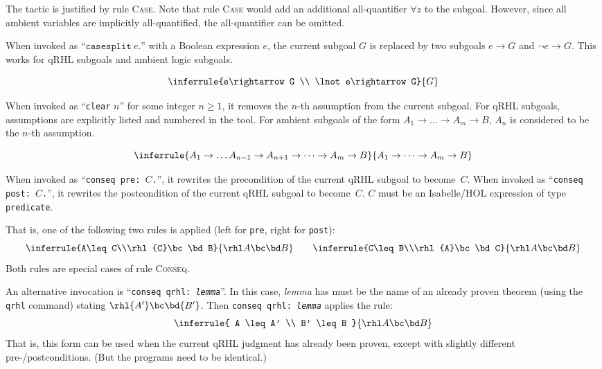 \documentclass{article}
\renewcommand\ruleref[1]{rule \hbox{\textsc{#1}}}
\begin{document}
The tactic is justified by \ruleref{Case}. Note that \ruleref{Case}
would add an additional all-quantifier $\forall z$
to the subgoal. However, since all ambient variables are implicitly
all-quantified, the all-quantifier can be omitted.



When invoked as ``$\mathtt{casesplit}\ e\mathtt{.}$''
with a Boolean expression $e$,
the current subgoal $G$
is replaced by two subgoals $e\rightarrow G$
and $\lnot e\rightarrow G$.
This works for qRHL subgoals and ambient logic subgoals.

\[
  \inferrule
  {e\rightarrow G
    \\
    \lnot e\rightarrow G}
  {G}
\]


When invoked as ``\texttt{clear} $n$''
for some integer $n\geq 1$,
it removes the $n$-th
assumption from the current subgoal. For qRHL subgoals, assumptions
are explicitly listed and numbered in the tool. For ambient subgoals of the form
$A_1\to \dots \to A_m\to B$,
$A_n$ is considered to be the $n$-th assumption.

\[
  \inferrule
  {A_1\to \dots A_{n-1}\to A_{n+1}\to\dots \to A_m\to B}
  {A_1\to \dots \to A_m\to B}
\]




When invoked as ``\texttt{conseq pre: $C$.}'',
it rewrites the precondition of the current qRHL subgoal to become~$C$.
When invoked as ``\texttt{conseq post: $C$.}'',
it rewrites the postcondition of the current qRHL subgoal to become~$C$.
$C$ must be an Isabelle/HOL expression of type \texttt{predicate}.

That is, one of the following two rules is applied (left for
\texttt{pre}, right for \texttt{post}):
\[
  \inferrule{A\leq C\\\rhl{C}\bc\bd B}{\rhl A\bc\bd B}
  \qquad
  \inferrule{C\leq B\\\rhl{A}\bc\bd C}{\rhl A\bc\bd B}
\]
%
Both rules are special cases of \ruleref{Conseq}.

\bigskip

An alternative invocation is ``\texttt{conseq qrhl:\
  \textit{lemma}}''. In this case, \textit{lemma} has must be the name
of an already proven theorem (using the \texttt{qrhl} command) stating
$\rhl{A'}\bc\bd{B'}$. Then \texttt{conseq qrhl:\ \textit{lemma}} applies the rule:
\[
  \inferrule{
    A \leq A' \\
    B' \leq B
  }{
    \rhl A\bc\bd B
  }
\]
That is, this form can be used when the current qRHL judgment has
already been proven, except with slightly different
pre-/postconditions. (But the programs need to be
identical.)
\end{document}
